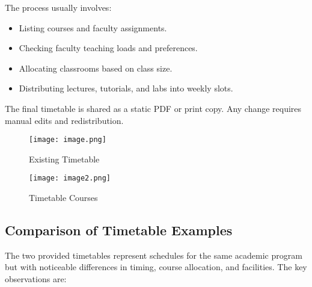 \documentclass[12pt]{article}
\begin{document}
The process usually involves:
\begin{itemize}
    \item Listing courses and faculty assignments.
    \item Checking faculty teaching loads and preferences.
    \item Allocating classrooms based on class size.
    \item Distributing lectures, tutorials, and labs into weekly slots.
\end{itemize}

The final timetable is shared as a static PDF or print copy. Any change requires manual edits and redistribution.
\begin{figure}[H]
    \centering
    \texttt{[image: image.png]}
    \caption{Existing Timetable}
    \label{fig:existing-timetable} %
\end{figure}
\begin{figure}[H]
    \centering
    \texttt{[image: image2.png]}
    \caption{Timetable Courses}
    \label{fig:timetable-courses} %
\end{figure}

\subsection{Comparison of Timetable Examples}
The two provided timetables represent schedules for the same academic program but with noticeable differences in timing, course allocation, and facilities. The key observations are:
\end{document}
